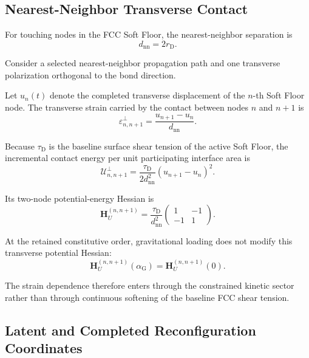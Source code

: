 \subsection{Nearest-Neighbor Transverse Contact}

For touching nodes in the FCC Soft Floor, the nearest-neighbor separation is
\begin{equation}
    d_{\mathrm{nn}} = 2r_{\mathrm{D}}.
\end{equation}

Consider a selected nearest-neighbor propagation path and one transverse polarization orthogonal to the bond direction.

Let $u_n(t)$ denote the completed transverse displacement of the $n$-th Soft Floor node. The transverse strain carried by the contact between nodes $n$ and $n+1$ is
\begin{equation}
    \varepsilon_{n,n+1}^{\perp} = \frac{u_{n+1}-u_n}{d_{\mathrm{nn}}}.
\end{equation}

Because $\tau_{\mathrm{D}}$ is the baseline surface shear tension of the active Soft Floor, the incremental contact energy per unit participating interface area is
\begin{equation}
    \boxed{ \mathcal{U}_{n,n+1}^{\perp} = \frac{\tau_{\mathrm{D}}}{2d_{\mathrm{nn}}^2} \left( u_{n+1}-u_n \right)^2 }.
\end{equation}

Its two-node potential-energy Hessian is
\begin{equation}
    \boxed{ \mathbf{H}_{U}^{(n,n+1)} = \frac{\tau_{\mathrm{D}}}{d_{\mathrm{nn}}^2}
    \begin{pmatrix}
        1 & -1 \\
        -1 & 1
    \end{pmatrix} }.
\end{equation}

At the retained constitutive order, gravitational loading does not modify this transverse potential Hessian:
\begin{equation}
    \boxed{ \mathbf{H}_{U}^{(n,n+1)}(\alpha_{\mathrm{G}}) = \mathbf{H}_{U}^{(n,n+1)}(0) }.
\end{equation}

The strain dependence therefore enters through the constrained kinetic sector rather than through continuous softening of the baseline FCC shear tension.

\subsection{Latent and Completed Reconfiguration Coordinates}

